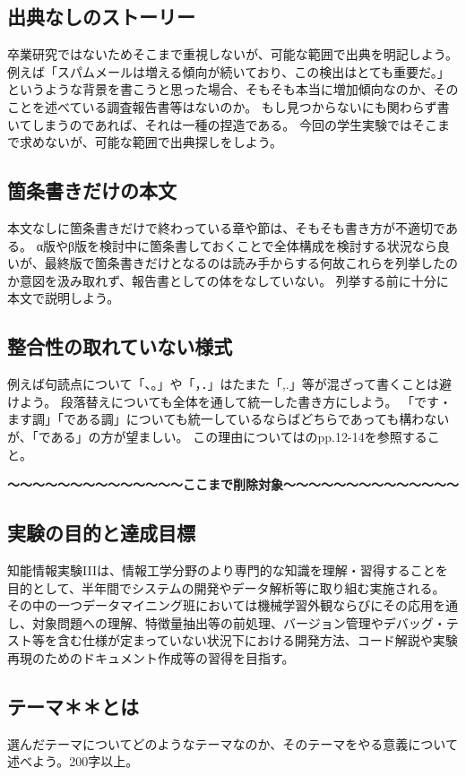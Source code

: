 \documentclass[a4paper, 11pt, titlepage]{jsarticle}
\begin{document}
\subsection{出典なしのストーリー}
卒業研究ではないためそこまで重視しないが、可能な範囲で出典を明記しよう。
例えば「スパムメールは増える傾向が続いており、この検出はとても重要だ。」というような背景を書こうと思った場合、そもそも本当に増加傾向なのか、そのことを述べている調査報告書等はないのか。
もし見つからないにも関わらず書いてしまうのであれば、それは一種の捏造である。
今回の学生実験ではそこまで求めないが、可能な範囲で出典探しをしよう。

\subsection{箇条書きだけの本文}
本文なしに箇条書きだけで終わっている章や節は、そもそも書き方が不適切である。
α版やβ版を検討中に箇条書しておくことで全体構成を検討する状況なら良いが、最終版で箇条書きだけとなるのは読み手からする何故これらを列挙したのか意図を汲み取れず、報告書としての体をなしていない。
列挙する前に十分に本文で説明しよう。

\subsection{整合性の取れていない様式}
例えば句読点について「、。」や「，．」はたまた「,.」等が混ざって書くことは避けよう。
段落替えについても全体を通して統一した書き方にしよう。
「です・ます調」「である調」についても統一しているならばどちらであっても構わないが、「である」の方が望ましい。
この理由については\cite{kanazawa}のpp.12-14を参照すること。

{\bf 〜〜〜〜〜〜〜〜〜〜〜〜〜〜ここまで削除対象〜〜〜〜〜〜〜〜〜〜〜〜〜〜}

\subsection{実験の目的と達成目標}
知能情報実験IIIは、情報工学分野のより専門的な知識を理解・習得することを目的として、半年間でシステムの開発やデータ解析等に取り組む実施される。
その中の一つデータマイニング班においては機械学習外観ならびにその応用を通し、対象問題への理解、特徴量抽出等の前処理、バージョン管理やデバッグ・テスト等を含む仕様が定まっていない状況下における開発方法、コード解説や実験再現のためのドキュメント作成等の習得を目指す。

\subsection{テーマ＊＊とは}
選んだテーマについてどのようなテーマなのか、そのテーマをやる意義について述べよう。200字以上。
\end{document}
